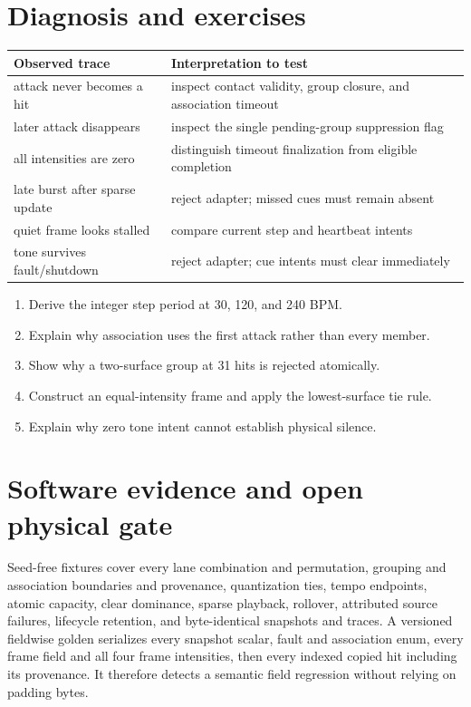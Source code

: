 \documentclass[11pt]{article}
\begin{document}
\section{Diagnosis and exercises}
\begin{tabularx}{\linewidth}{@{}X X@{}}
\toprule
Observed trace & Interpretation to test\\
\midrule
attack never becomes a hit & inspect contact validity, group closure, and association timeout\\
later attack disappears & inspect the single pending-group suppression flag\\
all intensities are zero & distinguish timeout finalization from eligible completion\\
late burst after sparse update & reject adapter; missed cues must remain absent\\
quiet frame looks stalled & compare current step and heartbeat intents\\
tone survives fault/shutdown & reject adapter; cue intents must clear immediately\\
\bottomrule
\end{tabularx}

\begin{enumerate}
 \item Derive the integer step period at 30, 120, and 240 BPM.
 \item Explain why association uses the first attack rather than every member.
 \item Show why a two-surface group at 31 hits is rejected atomically.
 \item Construct an equal-intensity frame and apply the lowest-surface tie rule.
 \item Explain why zero tone intent cannot establish physical silence.
\end{enumerate}

\section{Software evidence and open physical gate}
Seed-free fixtures cover every lane combination and permutation, grouping and
association boundaries and provenance, quantization ties, tempo endpoints,
atomic capacity, clear dominance, sparse playback, rollover, attributed
source failures, lifecycle retention, and byte-identical snapshots and traces.
A versioned fieldwise golden serializes every snapshot scalar, fault and
association enum, every frame field and all four frame intensities, then every
indexed copied hit including its provenance. It therefore detects a semantic
field regression without relying on padding bytes.
\end{document}
